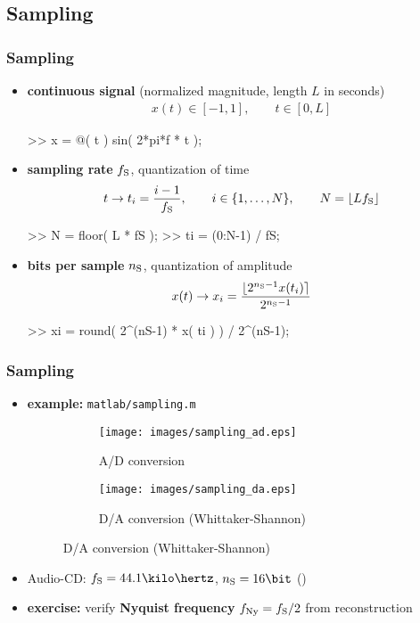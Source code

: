 
\subsection{Sampling}

\begin{frame}[fragile]
	\frametitle{Sampling}
	\begin{itemize}
		\item \textbf{continuous signal} (normalized magnitude, length $L$ in seconds)
			\begin{align*}
				x(t)\in[-1,1],\qquad t\in[0,L]
			\end{align*}
			\begin{code}
>> x = @( t ) sin( 2*pi*f * t ); \color[medium]%
			\end{code}
		\item \textbf{sampling rate} $f_{\textrm S}$, quantization of time
			\begin{align*}
				t\rightarrow t_i=\frac{i-1}{f_{\textrm S}},\qquad i\in\{1,\ldots,N\},\qquad N=\lfloor Lf_{\textrm S}\rfloor
			\end{align*}
			\begin{code}
>> N = floor( L * fS );
>> ti = (0:N-1) / fS; \color[medium]%
			\end{code}
		\item \textbf{bits per sample} $n_{\textrm S}$, quantization of amplitude
			\begin{align*}
				x(t)\rightarrow x_i=\frac{\lfloor2^{n_{\textrm S}-1}x(t_i)\rceil}{2^{n_{\textrm S}-1}}
			\end{align*}
			\begin{code}
>> xi = round( 2^(nS-1) * x( ti ) ) / 2^(nS-1); \color[medium]%
			\end{code}
	\end{itemize}
\end{frame}

\begin{frame}
	\frametitle{Sampling}
	\begin{itemize}
		\item \textbf{example:} \texttt{matlab/sampling.m}
			\begin{figure}
				\centering
				\begin{subfigure}[t]{0.48\linewidth}
					\texttt{[image: images/sampling\_ad.eps]}
					\caption{A/D conversion}
				\end{subfigure}
				\hspace{0.02\linewidth}
				\begin{subfigure}[t]{0.48\linewidth}
					\texttt{[image: images/sampling\_da.eps]}
					\caption{D/A conversion (Whittaker-Shannon)}
				\end{subfigure}
			\end{figure}
		\item Audio-CD: $f_{\textrm S}=44.1\kilo\hertz$, $n_{\textrm S}=16\bit$ ()
		\item \textbf{exercise:} verify \textbf{Nyquist frequency} $f_{\textrm{Ny}}=f_{\textrm S}/2$ from reconstruction
	\end{itemize}
\end{frame}


